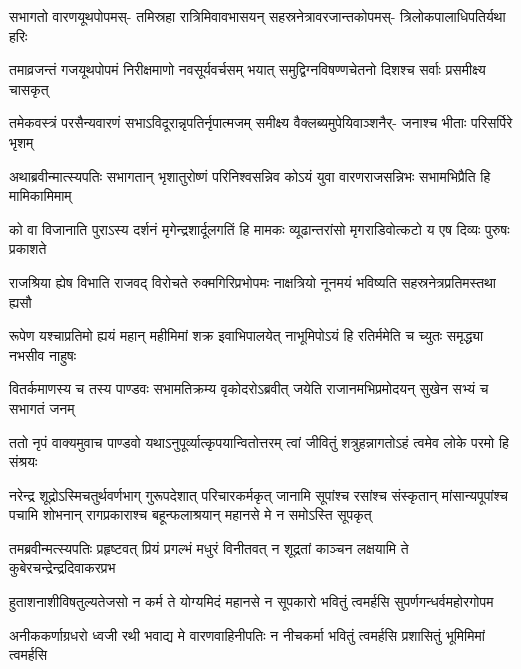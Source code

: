 \fourlineindentedshloka
{सभागतो वारणयूथपोपमस्-}
{तमिस्रहा रात्रिमिवावभासयन्}
{सहस्रनेत्रावरजान्तकोपमस्-}
{त्रिलोकपालाधिपतिर्यथा हरिः}


\fourlineindentedshloka
{तमाव्रजन्तं गजयूथपोपमं}
{निरीक्षमाणो नवसूर्यवर्चसम्}
{भयात् समुद्विग्नविषण्णचेतनो}
{दिशश्च सर्वाः प्रसमीक्ष्य चासकृत्}


\fourlineindentedshloka
{तमेकवस्त्रं परसैन्यवारणं}
{सभाऽविदूरान्नृपतिर्नृपात्मजम्}
{समीक्ष्य वैक्लब्यमुपेयिवाञ्शनैर्-}
{जनाश्च भीताः परिसर्पिरे भृशम्}


\fourlineindentedshloka
{अथाब्रवीन्मात्स्यपतिः सभागतान्}
{भृशातुरोष्णं परिनिश्वसन्निव}
{कोऽयं युवा वारणराजसन्निभः}
{सभामभिप्रैति हि मामिकामिमाम्}


\fourlineindentedshloka
{को वा विजानाति पुराऽस्य दर्शनं}
{मृगेन्द्रशार्दूलगतिं हि मामकः}
{व्यूढान्तरांसो मृगराडिवोत्कटो}
{य एष दिव्यः पुरुषः प्रकाशते}


\fourlineindentedshloka
{राजश्रिया ह्येष विभाति राजवद्}
{विरोचते रुक्मगिरिप्रभोपमः}
{नाक्षत्रियो नूनमयं भविष्यति}
{सहस्रनेत्रप्रतिमस्तथा ह्यसौ}


\fourlineindentedshloka
{रूपेण यश्चाप्रतिमो ह्ययं महान्}
{महीमिमां शक्र इवाभिपालयेत्}
{नाभूमिपोऽयं हि रतिर्ममेति च}
{च्युतः समृद्ध्या नभसीव नाहुषः}



\fourlineindentedshloka
{वितर्कमाणस्य च तस्य पाण्डवः}
{सभामतिक्रम्य वृकोदरोऽब्रवीत्}
{जयेति राजानमभिप्रमोदयन्}
{सुखेन सभ्यं च सभागतं जनम्}


\fourlineindentedshloka
{ततो नृपं वाक्यमुवाच पाण्डवो}
{यथाऽनुपूर्व्यात्कृपयान्वितोत्तरम्}
{त्वां जीवितुं शत्रुहन्नागतोऽहं}
{त्वमेव लोके परमो हि संश्रयः}


\sixlineindentedshloka
{नरेन्द्र शूद्रोऽस्मिचतुर्थवर्णभाग्}
{गुरूपदेशात् परिचारकर्मकृत्}
{जानामि सूपांश्च रसांश्च संस्कृतान्}
{मांसान्यपूपांश्च पचामि शोभनान्}
{रागप्रकाराश्च बहून्फलाश्रयान्}
{महानसे मे न समोऽस्ति सूपकृत्}



\fourlineindentedshloka
{तमब्रवीन्मत्स्यपतिः प्रहृष्टवत्}
{प्रियं प्रगल्भं मधुरं विनीतवत्}
{न शूद्रतां काञ्चन लक्षयामि ते}
{कुबेरचन्द्रेन्द्रदिवाकरप्रभ}


\fourlineindentedshloka
{हुताशनाशीविषतुल्यतेजसो}
{न कर्म ते योग्यमिदं महानसे}
{न सूपकारो भवितुं त्वमर्हसि}
{सुपर्णगन्धर्वमहोरगोपम}


\fourlineindentedshloka
{अनीककर्णाग्रधरो ध्वजी रथी}
{भवाद्य मे वारणवाहिनीपतिः}
{न नीचकर्मा भवितुं त्वमर्हसि}
{प्रशासितुं भूमिमिमां त्वमर्हसि}

